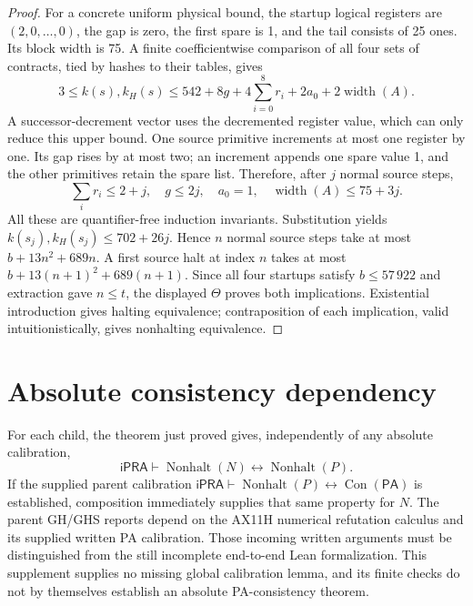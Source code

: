 \documentclass[11pt]{article}
\newcommand{\ipra}{\ensuremath{\mathsf{iPRA}}}
\newcommand{\Con}{\operatorname{Con}}
\begin{document}
\begin{proof}
For a concrete uniform physical bound, the startup logical registers
are $(2,0,\ldots,0)$, the gap is zero, the first spare is 1, and the tail
consists of 25 ones. Its block width is 75. A finite coefficientwise
comparison of all four sets of contracts, tied by hashes to their tables,
gives
\[
 3\le k(s),k_H(s)\le
 542+8g+4\sum_{i=0}^{8}r_i+2a_0+2\operatorname{width}(A).
\]
A successor-decrement vector uses the decremented register value, which
can only reduce this upper bound. One source primitive increments at
most one register by one. Its gap rises by at most two; an increment
appends one spare value 1, and the other primitives retain the spare
list. Therefore, after $j$ normal source steps,
\[
 \sum_i r_i\le2+j,\quad g\le2j,\quad a_0=1,
 \quad\operatorname{width}(A)\le75+3j.
\]
All these are quantifier-free induction invariants. Substitution yields
$k(s_j),k_H(s_j)\le702+26j$. Hence $n$ normal source steps take at most
$b+13n^2+689n$. A first source halt at index $n$ takes at most
$b+13(n+1)^2+689(n+1)$. Since all four startups satisfy $b\le57\,922$
and extraction gave $n\le t$, the displayed $\Theta$ proves both
implications. Existential introduction gives halting equivalence;
contraposition of each implication, valid intuitionistically, gives
nonhalting equivalence.
\end{proof}

\section{Absolute consistency dependency}
For each child, the theorem just proved gives, independently of any
absolute calibration,
\[
 \ipra\vdash\operatorname{Nonhalt}(N)
       \leftrightarrow\operatorname{Nonhalt}(P).
\]
If the supplied parent calibration
$\ipra\vdash\operatorname{Nonhalt}(P)\leftrightarrow\Con(\mathsf{PA})$
is established, composition immediately supplies that same property for
$N$. The parent GH/GHS reports depend on the AX11H numerical refutation
calculus and its supplied written PA calibration. Those incoming written
arguments must be distinguished from the still incomplete end-to-end
Lean formalization. This supplement supplies no missing global
calibration lemma, and its finite checks do not by themselves establish
an absolute PA-consistency theorem.
\end{document}
